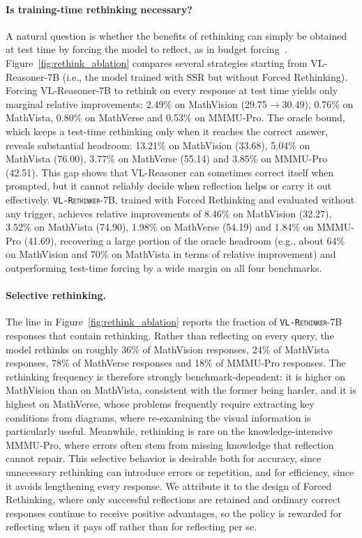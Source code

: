 \documentclass{article}
\newcommand{\model}{\texttt{\textsc{VL-Rethinker}}\xspace}
\begin{document}
\paragraph{Is training-time rethinking necessary?} A natural question is whether the benefits of rethinking can simply be obtained at test time by forcing the model to reflect, as in budget forcing~\citep{s1}. Figure~\ref{fig:rethink_ablation} compares several strategies starting from VL-Reasoner-7B (i.e., the model trained with SSR but without Forced Rethinking). Forcing VL-Reasoner-7B to rethink on every response at test time yields only marginal relative improvements: 2.49\% on MathVision (29.75$\rightarrow$30.49), 0.76\% on MathVista, 0.80\% on MathVerse and 0.53\% on MMMU-Pro. The oracle bound, which keeps a test-time rethinking only when it reaches the correct answer, reveals substantial headroom: 13.21\% on MathVision (33.68), 5.04\% on MathVista (76.00), 3.77\% on MathVerse (55.14) and 3.85\% on MMMU-Pro (42.51). This gap shows that VL-Reasoner can sometimes correct itself when prompted, but it cannot reliably decide when reflection helps or carry it out effectively. \model-7B, trained with Forced Rethinking and evaluated without any trigger, achieves relative improvements of 8.46\% on MathVision (32.27), 3.52\% on MathVista (74.90), 1.98\% on MathVerse (54.19) and 1.84\% on MMMU-Pro (41.69), recovering a large portion of the oracle headroom (e.g., about 64\% on MathVision and 70\% on MathVista in terms of relative improvement) and outperforming test-time forcing by a wide margin on all four benchmarks.

\paragraph{Selective rethinking.} The line in Figure~\ref{fig:rethink_ablation} reports the fraction of \model-7B responses that contain rethinking. Rather than reflecting on every query, the model rethinks on roughly 36\% of MathVision responses, 24\% of MathVista responses, 78\% of MathVerse responses and 18\% of MMMU-Pro responses. The rethinking frequency is therefore strongly benchmark-dependent: it is higher on MathVision than on MathVista, consistent with the former being harder, and it is highest on MathVerse, whose problems frequently require extracting key conditions from diagrams, where re-examining the visual information is particularly useful. Meanwhile, rethinking is rare on the knowledge-intensive MMMU-Pro, where errors often stem from missing knowledge that reflection cannot repair. This selective behavior is desirable both for accuracy, since unnecessary rethinking can introduce errors or repetition, and for efficiency, since it avoids lengthening every response. We attribute it to the design of Forced Rethinking, where only successful reflections are retained and ordinary correct responses continue to receive positive advantages, so the policy is rewarded for reflecting when it pays off rather than for reflecting per se.
\end{document}
